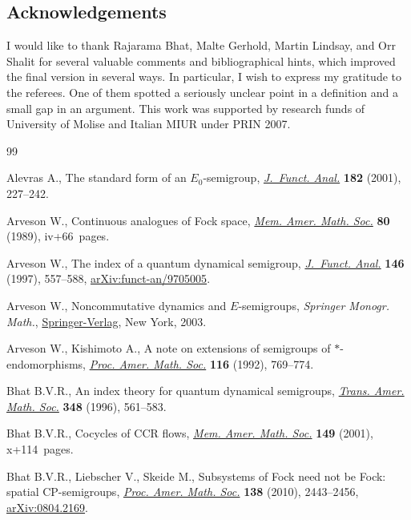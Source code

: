 \documentclass[pdftex]{sigma}%
\numberwithin{equation}{section}
\begin{document}
\subsection*{Acknowledgements}

I would like to thank Rajarama Bhat, Malte Gerhold, Martin Lindsay, and Orr Shalit for several valuable comments and bibliographical hints, which improved the final version in several ways. In particular, I wish to express my gratitude to the referees. One of them spotted a seriously unclear point in a definition and a small gap in an argument. This work was supported by research funds of University of Molise and Italian MIUR under PRIN 2007.

\begin{thebibliography}{99}
\footnotesize\itemsep=0pt

Alevras A., The standard form of an {$E_0$}-semigroup, \href{https://doi.org/10.1006/jfan.2000.3716}{\textit{J.~Funct. Anal.}}
 \textbf{182} (2001), 227--242.

Arveson W., Continuous analogues of {F}ock space, \href{https://doi.org/10.1090/memo/0409}{\textit{Mem. Amer. Math.
 Soc.}} \textbf{80} (1989), iv+66~pages.

Arveson W., The index of a quantum dynamical semigroup, \href{https://doi.org/10.1006/jfan.1996.3045}{\textit{J.~Funct.
 Anal.}} \textbf{146} (1997), 557--588, \href{https://arxiv.org/abs/funct-an/9705005}{arXiv:funct-an/9705005}.

Arveson W., Noncommutative dynamics and {$E$}-semigroups, \textit{Springer Monogr.
 Math.}, \href{https://doi.org/10.1007/978-0-387-21524-2}{Springer-Verlag}, New York, 2003.

Arveson W., Kishimoto A., A note on extensions of semigroups of
 {$*$}-endomorphisms, \href{https://doi.org/10.2307/2159445}{\textit{Proc. Amer. Math. Soc.}} \textbf{116} (1992),
 769--774.

Bhat B.V.R., An index theory for quantum dynamical semigroups, \href{https://doi.org/10.1090/S0002-9947-96-01520-6}{\textit{Trans.
 Amer. Math. Soc.}} \textbf{348} (1996), 561--583.

Bhat B.V.R., Cocycles of {CCR} flows, \href{https://doi.org/10.1090/memo/0709}{\textit{Mem. Amer. Math. Soc.}}
 \textbf{149} (2001), x+114~pages.

Bhat B.V.R., Liebscher V., Skeide M., Subsystems of {F}ock need not be {F}ock:
 spatial {CP}-semigroups, \href{https://doi.org/10.1090/S0002-9939-10-10260-3}{\textit{Proc. Amer. Math. Soc.}} \textbf{138} (2010),
 2443--2456, \href{https://arxiv.org/abs/0804.2169}{arXiv:0804.2169}.


\end{thebibliography}
\end{document}
